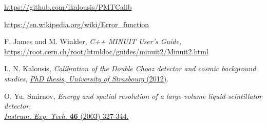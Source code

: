 \documentclass[a4paper,11pt]{article}
\begin{document}
\begin{thebibliography}{99}
 \href{https://github.com/lkalousis/PMTCalib}{https://github.com/lkalousis/PMTCalib}

 \href{https://en.wikipedia.org/wiki/Error\_function}{https://en.wikipedia.org/wiki/Error\_function}

 F. James and M. Winkler, \emph{C++ MINUIT User's Guide},
\href{https://root.cern.ch/root/htmldoc/guides/minuit2/Minuit2.html}{https://root.cern.ch/root/htmldoc/guides/minuit2/Minuit2.html}

 L. N. Kalousis, \emph{Calibration of the Double Chooz detector and cosmic background studies}, \href{http://inspirehep.net/record/1295030}{\emph{PhD thesis, University of Strasbourg} (2012)}. 

 O. Yu. Smirnov, \emph{Energy and spatial resolution of a large-volume liquid-scintillator detector}, \\
\href{https://link.springer.com/article/10.1023/A:1024458203966}{\emph{Instrum. Exp. Tech.} {\bf 46} (2003) 327-344.}


\end{thebibliography}
\end{document}
